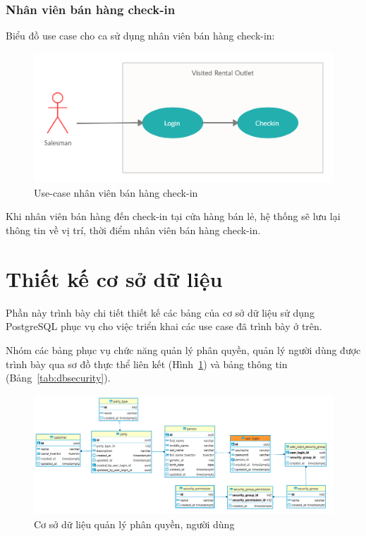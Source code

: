 \subsubsection{Nhân viên bán hàng check-in}
Biểu đồ use case cho ca sử dụng nhân viên bán hàng check-in:
\begin{figure}[H]
\centering
\includegraphics[width=14cm]{images/use-case/salesman.jpg}
\caption{Use-case nhân viên bán hàng check-in}
\end{figure}
Khi nhân viên bán hàng đến check-in tại cửa hàng bán lẻ,
hệ thống sẽ lưu lại thông tin về vị trí, thời điểm nhân
viên bán hàng check-in.

\section{Thiết kế cơ sở dữ liệu}
Phần này trình bày chi tiết thiết kế các bảng của cơ sở dữ
liệu sử dụng PostgreSQL phục vụ cho việc triển khai các use case
đã trình bày ở trên.

Nhóm các bảng phục vụ chức năng quản lý phân quyền, quản lý
người dùng được trình bày qua sơ đồ thực thể liên kết
(Hình~\ref{fig:dbsecurity}) và bảng thông tin (Bảng~\ref{tab:dbsecurity}).

\begin{figure}[H]
\centering
\includegraphics[width=17cm]{images/database/security.png}
\caption{Cơ sở dữ liệu quản lý phân quyền, người dùng}
\label{fig:dbsecurity}
\end{figure}

